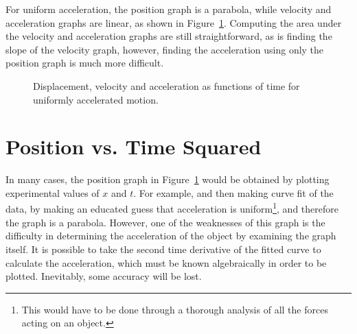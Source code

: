 \documentclass[11pt]{article}
\begin{document}
For uniform acceleration, the position graph is a parabola, while velocity and
acceleration graphs are linear, as shown in Figure~\ref{uniform-acceleration}.
Computing the area under the velocity and acceleration graphs are still
straightforward, as is finding the slope of the velocity graph, however,
finding the acceleration using only the position graph is much more difficult.
\begin{figure}[!ht]
  \centering
  \hspace{.15in}
  \hspace{.15in}
  \caption{Displacement, velocity and acceleration as functions of time for
    uniformly accelerated motion.}
  \label{uniform-acceleration}
\end{figure}


\section{Position vs. Time Squared}
In many cases, the position graph in Figure~\ref{uniform-acceleration} would be
obtained by plotting experimental values of $x$ and $t$. For example, and then making
curve fit of the data, by making an educated guess that acceleration is
uniform\footnote{This would have to be done through a thorough analysis of all
  the forces acting on an object.}, and therefore the graph is a parabola.
However, one of the weaknesses of this graph is the difficulty in determining
the acceleration of the object by examining the graph itself. It is possible to
take the second time derivative of the fitted curve to calculate the
acceleration, which must be known algebraically in order to be plotted.
Inevitably, some accuracy will be lost.
\end{document}
